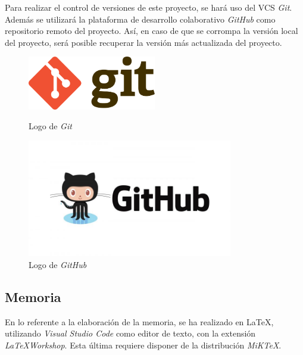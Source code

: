 Para realizar el control de versiones de este proyecto, se hará uso del VCS \textit{Git}. Además se utilizará la 
plataforma de desarrollo colaborativo \textit{GitHub} como repositorio remoto del proyecto. Así, en caso de que 
se corrompa la versión local del proyecto, será posible recuperar la versión más actualizada del proyecto.
\newpage
\begin{figure}[H]
    \centering
    \begin{minipage}{0.38\textwidth}
        \centering
        \includegraphics[width=0.5\textwidth]{Figures/Logo_Git.png}
        \caption{Logo de \textit{Git}}
    \end{minipage} \hspace{2cm}
    \begin{minipage}{0.38\textwidth}
        \centering
        \includegraphics[width=0.8\textwidth]{Figures/Logo_GitHub.jpg}
        \caption{Logo de \textit{GitHub}}
    \end{minipage}
\end{figure}

\subsection{Memoria}
En lo referente a la elaboración de la memoria, se ha realizado en \LaTeX, utilizando \textit{Visual Studio Code} como editor 
de texto, con la extensión \textit{\LaTeX Workshop}. Esta última requiere disponer de la distribución \textit{MiKTeX}. 

